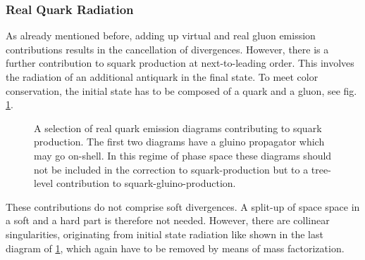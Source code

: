 \subsubsection*{Real Quark Radiation}
As already mentioned before, adding up virtual and real gluon emission contributions results in the cancellation of divergences. However, there is a further contribution to squark production at next-to-leading order. This involves the radiation of an additional antiquark in the final state. To meet color conservation, the initial state has to be composed of a quark and a gluon, see fig. \ref{fig:quarkradiation}.
\begin{figure}[!htbp]
\begin{center}
\caption{A selection of real quark emission diagrams contributing to squark production. The first two diagrams have a gluino propagator which may go on-shell. In this regime of phase space these diagrams should not be included in the correction to squark-production but to a tree-level contribution to squark-gluino-production.}\label{fig:quarkradiation}
\end{center}
\end{figure}
These contributions do not comprise soft divergences. A split-up of space space in a soft and a hard part is therefore not needed. However, there are collinear singularities, originating from initial state radiation like shown in the last diagram of \ref{fig:quarkradiation}, which again have to be removed by means of mass factorization.\\
